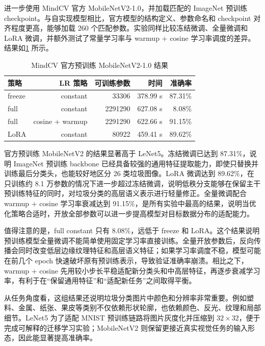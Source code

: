 进一步使用 MindCV 官方 MobileNetV2-1.0，并加载匹配的 ImageNet 预训练 checkpoint。与自实现模型相比，官方模型的结构定义、参数命名和 checkpoint 对齐程度更高，能够加载 260 个匹配参数。实验同样比较冻结微调、全量微调和 LoRA 微调，并额外测试了常量学习率与 warmup + cosine 学习率调度的差异。结果如\cref{tab:mobile_mindcv} 所示。

\begin{table}[!htb]
  \centering
  \caption{MindCV 官方预训练 MobileNetV2-1.0 结果}
  \label{tab:mobile_mindcv}
  \small
  \begin{tabular}{@{}lrrrr@{}}
    \toprule
    \textbf{策略} & \textbf{LR 策略} & \textbf{可训练参数} & \textbf{时间} & \textbf{准确率} \\
    \midrule
    freeze & constant & 33306 & 378.99 s & 87.31\% \\
    full & constant & 2291290 & 627.08 s & 8.08\% \\
    full & cosine + warmup & 2291290 & 622.66 s & 91.15\% \\
    LoRA & constant & 80922 & 459.41 s & 89.62\% \\
    \bottomrule
  \end{tabular}
\end{table}

官方预训练 MobileNetV2 的结果显著高于 LeNet5。冻结微调已达到 87.31\%，说明 ImageNet 预训练 backbone 已经具备较强的通用特征提取能力，即使只替换并训练最后分类头，也能较好地区分 26 类垃圾图像。LoRA 微调达到 89.62\%，在只训练约 8.1 万参数的情况下进一步超过冻结微调，说明低秩分支能够在保留主干预训练特征的同时，对垃圾分类的高层语义表示进行轻量修正。全量微调配合 warmup + cosine 学习率衰减达到 91.15\%，是所有实验中最高的结果，说明当优化策略合适时，开放全部参数可以进一步提高模型对目标数据分布的适配能力。

值得注意的是，full constant 只有 8.08\%，远低于 freeze 和 LoRA。这个结果说明预训练模型全量微调不能简单使用固定学习率直接训练。全量开放参数后，反向传播会同时改变低层边缘纹理特征和高层语义特征；如果学习率调度不稳，模型可能在前几个 epoch 快速破坏原有预训练表示，导致验证准确率崩溃。相比之下，warmup + cosine 先用较小步长平稳适配新分类头和中高层特征，再逐步衰减学习率，有利于在“保留通用特征”和“适配新任务”之间取得平衡。

从任务角度看，这组结果还说明垃圾分类图片中颜色和分辨率非常重要。例如塑料、金属、纸张、果皮等类别不仅依赖形状轮廓，也依赖颜色、反光、纹理和局部细节。LeNet5 为了适配 MNIST 预训练链路将图片灰度化并压缩到 $32\times32$，便于完成可解释的迁移学习实验；MobileNetV2 则保留更接近真实视觉任务的输入形态，因此能显著提高准确率。

